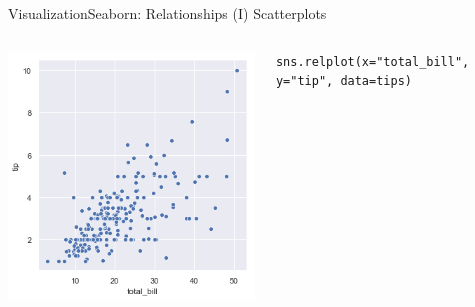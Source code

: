 \documentclass[10pt,compress]{beamer} %
\begin{document}
\begin{frame}[fragile]{Visualization}{Seaborn: Relationships (I)}
	\centering Scatterplots

	\begin{columns}[t]
	\includegraphics[width=\textwidth]{figs/sns-scatterplot.png}\\
	\begin{exampleblock}{}
	\vspace{-0.2cm} 
	\begin{lstlisting}[basicstyle=\tiny]
	sns.relplot(x="total_bill", y="tip", data=tips)
	\end{lstlisting}
	\vspace{-0.2cm} 
	\end{exampleblock}


\end{columns}
\end{frame}
\end{document}
